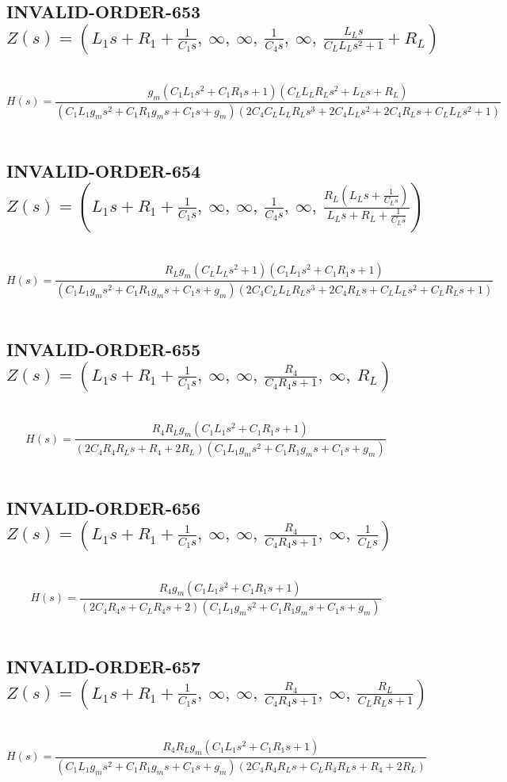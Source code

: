 \documentclass{article}
\begin{document}
\subsection{INVALID-ORDER-653 $Z(s) = \left( L_{1} s + R_{1} + \frac{1}{C_{1} s}, \  \infty, \  \infty, \  \frac{1}{C_{4} s}, \  \infty, \  \frac{L_{L} s}{C_{L} L_{L} s^{2} + 1} + R_{L}\right)$ } \ 
\textbf{\[H(s) = \frac{g_{m} \left(C_{1} L_{1} s^{2} + C_{1} R_{1} s + 1\right) \left(C_{L} L_{L} R_{L} s^{2} + L_{L} s + R_{L}\right)}{\left(C_{1} L_{1} g_{m} s^{2} + C_{1} R_{1} g_{m} s + C_{1} s + g_{m}\right) \left(2 C_{4} C_{L} L_{L} R_{L} s^{3} + 2 C_{4} L_{L} s^{2} + 2 C_{4} R_{L} s + C_{L} L_{L} s^{2} + 1\right)}\] } \ 
\subsection{INVALID-ORDER-654 $Z(s) = \left( L_{1} s + R_{1} + \frac{1}{C_{1} s}, \  \infty, \  \infty, \  \frac{1}{C_{4} s}, \  \infty, \  \frac{R_{L} \left(L_{L} s + \frac{1}{C_{L} s}\right)}{L_{L} s + R_{L} + \frac{1}{C_{L} s}}\right)$ } \ 
\textbf{\[H(s) = \frac{R_{L} g_{m} \left(C_{L} L_{L} s^{2} + 1\right) \left(C_{1} L_{1} s^{2} + C_{1} R_{1} s + 1\right)}{\left(C_{1} L_{1} g_{m} s^{2} + C_{1} R_{1} g_{m} s + C_{1} s + g_{m}\right) \left(2 C_{4} C_{L} L_{L} R_{L} s^{3} + 2 C_{4} R_{L} s + C_{L} L_{L} s^{2} + C_{L} R_{L} s + 1\right)}\] } \ 
\subsection{INVALID-ORDER-655 $Z(s) = \left( L_{1} s + R_{1} + \frac{1}{C_{1} s}, \  \infty, \  \infty, \  \frac{R_{4}}{C_{4} R_{4} s + 1}, \  \infty, \  R_{L}\right)$ } \ 
\textbf{\[H(s) = \frac{R_{4} R_{L} g_{m} \left(C_{1} L_{1} s^{2} + C_{1} R_{1} s + 1\right)}{\left(2 C_{4} R_{4} R_{L} s + R_{4} + 2 R_{L}\right) \left(C_{1} L_{1} g_{m} s^{2} + C_{1} R_{1} g_{m} s + C_{1} s + g_{m}\right)}\] } \ 
\subsection{INVALID-ORDER-656 $Z(s) = \left( L_{1} s + R_{1} + \frac{1}{C_{1} s}, \  \infty, \  \infty, \  \frac{R_{4}}{C_{4} R_{4} s + 1}, \  \infty, \  \frac{1}{C_{L} s}\right)$ } \ 
\textbf{\[H(s) = \frac{R_{4} g_{m} \left(C_{1} L_{1} s^{2} + C_{1} R_{1} s + 1\right)}{\left(2 C_{4} R_{4} s + C_{L} R_{4} s + 2\right) \left(C_{1} L_{1} g_{m} s^{2} + C_{1} R_{1} g_{m} s + C_{1} s + g_{m}\right)}\] } \ 
\subsection{INVALID-ORDER-657 $Z(s) = \left( L_{1} s + R_{1} + \frac{1}{C_{1} s}, \  \infty, \  \infty, \  \frac{R_{4}}{C_{4} R_{4} s + 1}, \  \infty, \  \frac{R_{L}}{C_{L} R_{L} s + 1}\right)$ } \ 
\textbf{\[H(s) = \frac{R_{4} R_{L} g_{m} \left(C_{1} L_{1} s^{2} + C_{1} R_{1} s + 1\right)}{\left(C_{1} L_{1} g_{m} s^{2} + C_{1} R_{1} g_{m} s + C_{1} s + g_{m}\right) \left(2 C_{4} R_{4} R_{L} s + C_{L} R_{4} R_{L} s + R_{4} + 2 R_{L}\right)}\] } \ 
\end{document}

